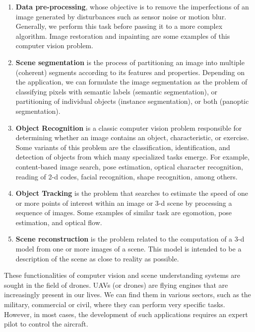 \begin{enumerate}[label=\roman*]
	\item \textbf{Data pre-processing}, whose objective is to remove the imperfections of an image generated by disturbances such as sensor noise or motion blur. Generally, we perform this task before passing it to a more complex algorithm. Image restoration and inpainting are some examples of this computer vision problem.
	
	\item \textbf{Scene segmentation} is the process of partitioning an image into multiple (coherent) segments according to its features and properties. Depending on the application, we can formulate the image segmentation as the problem of classifying pixels with semantic labels (semantic segmentation), or partitioning of individual objects (instance segmentation), or both (panoptic segmentation).
	
	\item \textbf{Object Recognition} is a classic computer vision problem responsible for determining whether an image contains an object, characteristic, or exercise. Some variants of this problem are the classification, identification, and detection of objects from which many specialized tasks emerge. For example, content-based image search, pose estimation, optical character recognition, reading of 2-d codes, facial recognition, shape recognition, among others.
	
	\item \textbf{Object Tracking} is the problem that searches to estimate the speed of one or more points of interest within an image or 3-d scene by processing a sequence of images. Some examples of similar task are egomotion, pose estimation, and optical flow.
	
	\item \textbf{Scene reconstruction} is the problem related to the computation of a 3-d model from one or more images of a scene. This model is intended to be a description of the scene as close to reality as possible. 	
\end{enumerate}

These functionalities of computer vision and scene understanding systems are sought in the field of drones. UAVs (or drones) are flying engines that are increasingly present in our lives. We can find them in various sectors, such as the military, commercial or civil, where they can perform very specific tasks. However, in most cases, the development of such applications requires an expert pilot to control the aircraft. 

